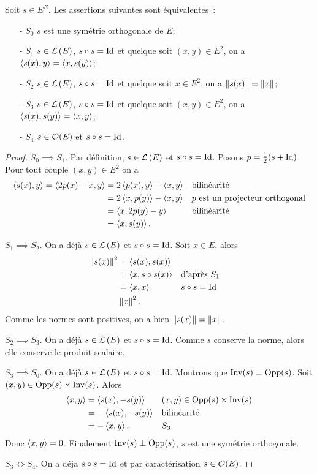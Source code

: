 \begin{theo}
  Soit $s \in E^E$. Les assertions suivantes sont équivalentes~:
  \begin{enumerate}
  \item[- $S_0$] $s$ est une symétrie orthogonale de $E$;
  \item[- $S_1$] $s\in \mathcal{L}\left(E\right)$, $s \circ s=\operatorname{Id}$ et quelque soit $(x,y) \in E^2$, on a $\left\langle{s(x)},{y}\right\rangle=\left\langle{x},{s(y)}\right\rangle$;
  \item[- $S_2$] $s\in \mathcal{L}\left(E\right)$, $s \circ s=\operatorname{Id}$ et quelque soit $x \in E^2$, on a $\left\lVert s(x)\right\rVert=\left\lVert x\right\rVert$;
  \item[- $S_3$] $s\in \mathcal{L}\left(E\right)$, $s \circ s=\operatorname{Id}$ et quelque soit $(x,y) \in E^2$, on a $\left\langle{s(x)},{s(y)}\right\rangle=\left\langle{x},{y}\right\rangle$;
  \item[- $S_4$] $s\in \mathcal{O}\!\left(E\right)$ et $s \circ s=\operatorname{Id}$.
  \end{enumerate}
\end{theo}
\begin{proof}
  $S_0 \implies S_1$. Par définition, $s \in \mathcal{L}\left(E\right)$ et $s \circ s=\operatorname{Id}$. Posons $p=\frac{1}{2}(s+\operatorname{Id})$. Pour tout couple $(x,y) \in E^2$ on a
  \begin{align}
    \left\langle{s(x)},{y}\right\rangle = \left\langle{2p(x)-x},{y}\right\rangle & = 2\left\langle{p(x)},{y}\right\rangle-\left\langle{x},{y}\right\rangle && \text{bilinéarité}\\
    &=2\left\langle{x},{p(y)}\right\rangle-\left\langle{x},{y}\right\rangle && p\text{~est un projecteur orthogonal}\\
    &=\left\langle{x},{2p(y)-y}\right\rangle && \text{bilinéarité}\\
    &=\left\langle{x},{s(y)}\right\rangle.
  \end{align}

  $S_1 \implies S_2$. On a déjà $s \in \mathcal{L}\left(E\right)$ et $s \circ s=\operatorname{Id}$. Soit $x \in E$, alors
  \begin{align}
    \left\lVert s(x)\right\rVert^2 &=\left\langle{s(x)},{s(x)}\right\rangle \\
    &=\left\langle{x},{s\circ s(x)}\right\rangle &&\text{d'après~} S_1 \\
    &=\left\langle{x},{x}\right\rangle && s\circ s=\operatorname{Id} \\
    &\left\lVert x\right\rVert^2.
  \end{align}
  Comme les normes sont positives, on a bien $\left\lVert s(x)\right\rVert=\left\lVert x\right\rVert$.

  $S_2 \implies S_3$. On a déjà $s \in \mathcal{L}\left(E\right)$ et $s \circ s=\operatorname{Id}$. Comme $s$ conserve la norme, alors elle conserve le produit scalaire.

  $S_3 \implies S_0$. On a déjà $s \in \mathcal{L}\left(E\right)$ et $s \circ s=\operatorname{Id}$. Montrons que $\operatorname{Inv}(s)\perp \operatorname{Opp}(s)$. Soit $(x,y) \in \operatorname{Opp}(s) \times \operatorname{Inv}(s)$. Alors
  \begin{align}
    \left\langle{x},{y}\right\rangle &= \left\langle{s(x)},{-s(y)}\right\rangle && (x,y) \in \operatorname{Opp}(s) \times \operatorname{Inv}(s) \\
    &=-\left\langle{s(x)},{-s(y)}\right\rangle && \text{bilinéarité} \\
    &=-\left\langle{x},{y}\right\rangle. && S_3
  \end{align}
  Donc $\left\langle{x},{y}\right\rangle=0$. Finalement $\operatorname{Inv}(s)\perp \operatorname{Opp}(s)$, $s$ est une symétrie orthogonale.

  $S_3 \iff S_4$. On a déja $s \circ s=\operatorname{Id}$ et par caractérisation $s \in \mathcal{O}\!\left(E\right)$. 
\end{proof}


